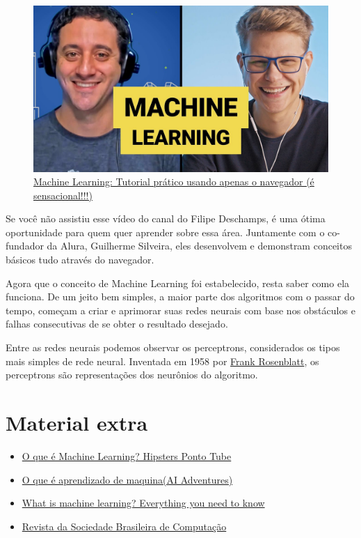 \documentclass{article}
\begin{document}
    \begin{figure}[htp]
        \centering
        \includegraphics[scale=0.3]{maxresdefault.jpg}
        \caption{\href{https://youtu.be/pbVwH8o837Ahttps://www.youtube.com/watch?v=JyGGMyR3x5I}{Machine Learning: Tutorial prático usando apenas o navegador (é sensacional!!!)}}
    \end{figure}


    Se você não assistiu esse vídeo do canal do Filipe Deschamps, é uma ótima oportunidade para 
    quem quer aprender sobre essa área. Juntamente com o co-fundador da Alura, Guilherme Silveira, 
    eles desenvolvem e demonstram conceitos básicos tudo através do navegador.

    Agora que o conceito de Machine Learning foi estabelecido, resta saber como ela funciona. De 
    um jeito bem simples, a maior parte dos algoritmos com o passar do tempo, começam a criar e 
    aprimorar suas redes neurais com base nos obstáculos e falhas consecutivas de se obter o 
    resultado desejado. 
    
    Entre as redes neurais podemos observar os perceptrons, considerados os tipos mais simples de 
    rede neural. Inventada em 1958 por \href{https://en.wikipedia.org/wiki/Arthur_Samuel}{Frank Rosenblatt}, 
    os perceptrons são representações dos neurônios do algoritmo.  

    \newpage
    \section*{\centering Material extra}\label{sec:extra} %

    \begin{itemize}
        \item \href{https://www.youtube.com/watch?v=Iuz_jc96bQk}{O que é Machine Learning? Hipsters Ponto Tube}
        \item \href{https://www.youtube.com/watch?v=HcqpanDadyQ}{O que é aprendizado de maquina(AI Adventures)}
        \item \href{https://www.zdnet.com/article/what-is-machine-learning-everything-you-need-to-know/}{What is machine learning? Everything you need to know}
        \item \href{https://www.sbc.org.br/images/flippingbook/computacaobrasil/computa_39/pdf/CompBrasil_39_180.pdf}{Revista da Sociedade Brasileira de Computação}
    \end{itemize}
\end{document}

